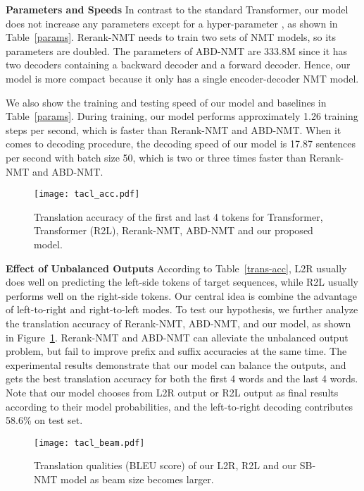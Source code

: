 \documentclass[11pt,a4paper]{article}
\begin{document}
\begin{CJK*}{UTF8}{gbsn}
\textbf{Parameters and Speeds}
In contrast to the standard Transformer, our model does not increase any parameters except for a hyper-parameter , as shown in Table~\ref{params}.
Rerank-NMT needs to train two sets of NMT models, so its parameters are doubled.
The parameters of ABD-NMT are 333.8M since it has two decoders containing a backward decoder and a forward decoder.
Hence, our model is more compact because it only has a single encoder-decoder NMT model.

We also show the training and testing speed of our model and baselines in Table~\ref{params}. 
During training, our model performs approximately 1.26 training steps per second, which is faster than Rerank-NMT and ABD-NMT.
When it comes to decoding procedure, the decoding speed of our model is 17.87 sentences per second with batch size 50, which is two or three times faster than Rerank-NMT and ABD-NMT.

\begin{figure}

	\setlength{\belowcaptionskip}{-0.2cm}
    \centering
    \texttt{[image: tacl\_acc.pdf]}
    \caption{Translation accuracy of the first and last 4 tokens for Transformer, Transformer (R2L), Rerank-NMT, ABD-NMT and our proposed model.
    }\label{tacl-acc-3}
\end{figure}



\textbf{Effect of Unbalanced Outputs}
According to Table~\ref{trans-acc}, L2R usually does well on predicting the left-side tokens of target sequences, while R2L usually performs well on the right-side tokens.
Our central idea is combine the advantage of left-to-right and right-to-left modes. To test our hypothesis, we further analyze the translation accuracy of Rerank-NMT, ABD-NMT, and our model, as shown in Figure~\ref{tacl-acc-3}. 
Rerank-NMT and ABD-NMT can alleviate the unbalanced output problem, but fail to improve prefix and suffix accuracies at the same time. 
The experimental results demonstrate that our model can balance the outputs, and gets the best translation accuracy for both the first 4 words and the last 4 words.
Note that our model chooses from L2R output or R2L output as final results according to their model probabilities, and the left-to-right decoding contributes 58.6\% on test set.

\begin{figure}
	\setlength{\abovecaptionskip}{0cm}
	\setlength{\belowcaptionskip}{-0.2cm}
	\centering
	\texttt{[image: tacl\_beam.pdf]}
	\caption{ Translation qualities (BLEU score) of our L2R, R2L and our SB-NMT model as beam size becomes larger\footnotemark[12]. 
	}\label{tacl_beam}
\end{figure}


\end{CJK*}
\end{document}
